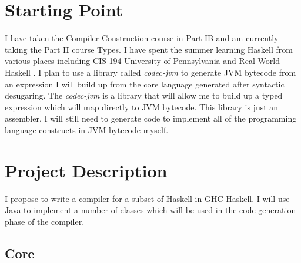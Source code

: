 \documentclass[a4paper]{article}
\begin{document}
\section*{Starting Point}
  I have taken the Compiler Construction course in Part IB and am currently taking the Part II course Types. I have spent the summer
  learning Haskell from various places including CIS 194 University of Pennsylvania \cite{cis194} and Real World Haskell \cite{realwordhaskell}.
  I plan to use a library called \textit{codec-jvm} to generate JVM bytecode from an expression I will build up from the core language generated after
  syntactic desugaring. The \textit{codec-jvm} is a library that will allow me to build up a typed expression which will map directly
  to JVM bytecode. This library is just an assembler, I will still need to generate code to implement all of the 
  programming language constructs in JVM bytecode myself.


\section*{Project Description}
  I propose to write a compiler for a subset of Haskell in GHC Haskell. I will use Java to implement a number of classes which will be used in the
  code generation phase of the compiler.

  \subsection*{Core}
\end{document}
